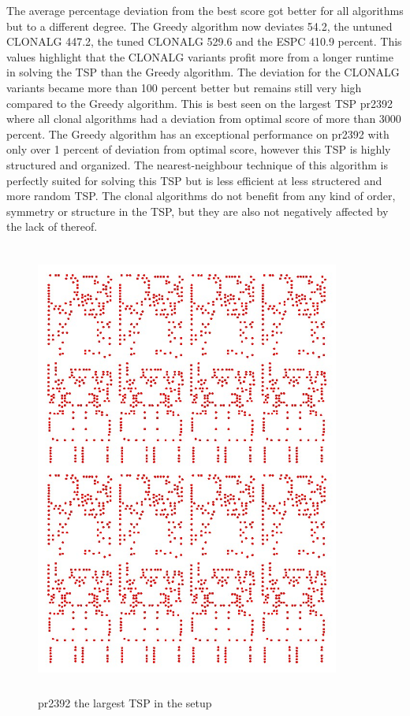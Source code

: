 The average percentage deviation from the best score got better for all algorithms but to a different degree. The Greedy algorithm now deviates 54.2, the untuned CLONALG 447.2, the tuned CLONALG 529.6 and the ESPC 410.9 percent. This values highlight that the CLONALG variants profit more from a longer runtime in solving the TSP than the Greedy algorithm. The deviation for the CLONALG variants became more than 100 percent better but remains still very high compared to the Greedy algorithm. This is best seen on the largest TSP pr2392 where all clonal algorithms had a deviation from optimal score of more than 3000 percent. The Greedy algorithm has an exceptional performance on pr2392 with only over 1 percent of deviation from optimal score, however this TSP is highly structured and organized. The nearest-neighbour technique of this algorithm is perfectly suited for solving this TSP but is less efficient at less structered and more random TSP. The clonal algorithms do not benefit from any kind of order, symmetry or structure in the TSP, but they are also not negatively affected by the lack of thereof. 
\begin{figure}[H]
	\includegraphics[width=10cm, height=15cm]{Images/pr2392.jpg}
	\caption{pr2392 the largest TSP in the setup}
	\label{pr2392}
\end{figure}
 
